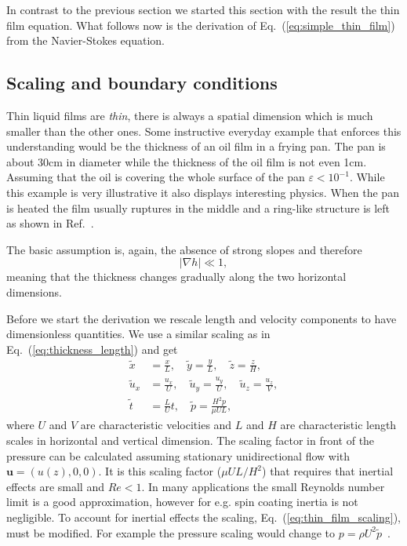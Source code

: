 In contrast to the previous section we started this section with the result the thin film equation.
What follows now is the derivation of Eq.~(\ref{eq:simple_thin_film}) from the Navier-Stokes equation.

\subsection{Scaling and boundary conditions}
\label{subsec:thin_film_scaling}
Thin liquid films are \textit{thin}, there is always a spatial dimension which is much smaller than the other ones. 
Some instructive everyday example that enforces this understanding would be the thickness of an oil film in a frying pan. 
The pan is about 30cm in diameter while the thickness of the oil film is not even 1cm.
Assuming that the oil is covering the whole surface of the pan $\varepsilon < 10^{-1}$.
While this example is very illustrative it also displays interesting physics.
When the pan is heated the film usually ruptures in the middle and a ring-like structure is left as shown in Ref.~\cite{fedorchenkoFormationDrySpots2021}.

The basic assumption is, again, the absence of strong slopes and therefore
\begin{equation}\label{eq:small_slopes}
    |\nabla h| \ll 1,  
\end{equation}
meaning that the thickness changes gradually along the two horizontal dimensions.

Before we start the derivation we rescale length and velocity components to have dimensionless quantities.
We use a similar scaling as in Eq.~(\ref{eq:thickness_length}) and get 
\begin{align}\label{eq:thin_film_scaling}
    \tilde{x} &= \frac{x}{L},\quad \tilde{y} = \frac{y}{L},\quad \tilde{z} = \frac{z}{H},\nonumber \\
    \tilde{u}_x &= \frac{u_x}{U},\quad \tilde{u}_y = \frac{u_y}{U},\quad \tilde{u}_z = \frac{u_z}{V},\nonumber \\
    \tilde{t} &= \frac{L}{U} t,\quad \tilde{p} = \frac{H^2 p}{\mu U L}, 
\end{align}
where $U$ and $V$ are characteristic velocities and $L$ and $H$ are characteristic length scales in horizontal and vertical dimension.
The scaling factor in front of the pressure can be calculated assuming stationary unidirectional flow with $\mathbf{u} = (u(z), 0, 0)$.
It is this scaling factor ($\mu U L /H^2$) that requires that inertial effects are small and $Re<1$.
In many applications the small Reynolds number limit is a good approximation, however for e.g. spin coating inertia is not negligible.
To account for inertial effects the scaling, Eq.~(\ref{eq:thin_film_scaling}), must be modified. 
For example the pressure scaling would change to $p = \rho U^2\tilde{p}$~\cite{crasterDynamicsStabilityThin2009}.

